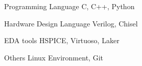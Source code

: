 

\begin{cvskills}
  \cvskill
  {Programming Language} %
  {C, C++, Python} %

  \cvskill
  {Hardware Design Language}
  {Verilog, Chisel}

  \cvskill
  {EDA tools}
  {HSPICE, Virtuoso, Laker}

  \cvskill
  {Others}
  {Linux Environment, Git}
\end{cvskills}
